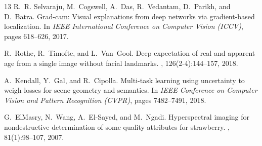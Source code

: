 \documentclass[10pt,twocolumn,letterpaper]{article}
\begin{document}
{\begin{thebibliography}{13}
R.~R. Selvaraju, M.~Cogswell, A.~Das, R.~Vedantam, D.~Parikh, and D.~Batra.
\newblock Grad-cam: Visual explanations from deep networks via gradient-based localization.
\newblock In {\em IEEE International Conference on Computer Vision (ICCV)}, pages 618--626, 2017.

R.~Rothe, R.~Timofte, and L.~Van~Gool.
\newblock Deep expectation of real and apparent age from a single image without facial landmarks.
, 126(2-4):144--157, 2018.

A.~Kendall, Y.~Gal, and R.~Cipolla.
\newblock Multi-task learning using uncertainty to weigh losses for scene geometry and semantics.
\newblock In {\em IEEE Conference on Computer Vision and Pattern Recognition (CVPR)}, pages 7482--7491, 2018.

G.~ElMasry, N.~Wang, A.~El-Sayed, and M.~Ngadi.
\newblock Hyperspectral imaging for nondestructive determination of some quality attributes for strawberry.
, 81(1):98--107, 2007.

\end{thebibliography}
}
\end{document}
